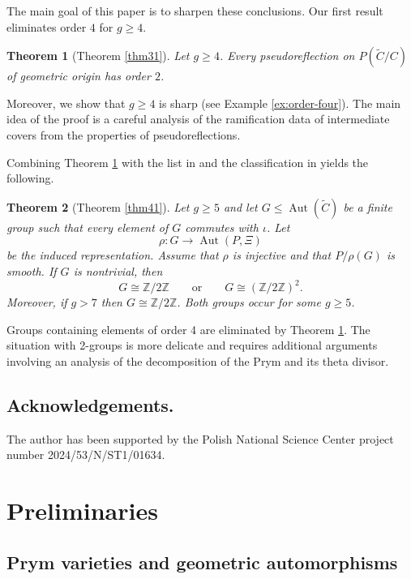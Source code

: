 \documentclass{article}
\newtheorem{thm}{Theorem}[section]
\numberwithin{equation}{section}
\newcommand{\ZZ}{\mathbb Z}
\DeclareMathOperator{\Aut}{Aut}
\begin{document}
The main goal of this paper is to sharpen these conclusions. Our first result eliminates order $4$ for $g \geq 4$.

\begin{thm}[Theorem \ref{thm31}]\label{thm:order-two}
Let $g\geq4$. Every pseudoreflection on $P(\widetilde C/C)$ of geometric origin has order $2$.
\end{thm}

Moreover, we show that $g \geq 4$ is sharp (see Example \ref{ex:order-four}). The main idea of the proof is a careful analysis of the ramification data of intermediate covers from the properties of pseudoreflections.  

Combining Theorem \ref{thm:order-two} with the list in \cite[Proposition 5.1]{ALN} and the classification in \cite[Theorem 3.5]{ALA} yields the following.

\begin{thm}[Theorem \ref{thm41}]\label{thm:main}
Let $g\geq5$ and let $G\leq \Aut(\widetilde C)$ be a finite group such that every element of $G$ commutes with $\iota$. Let
\[
\rho\colon G\longrightarrow \Aut(P,\Xi)
\]
be the induced representation. Assume that $\rho$ is injective and that $P/\rho(G)$ is smooth. If $G$ is nontrivial, then $$ G\cong \ZZ/2\ZZ \qquad\text{or}\qquad G\cong (\ZZ/2\ZZ)^2.$$
Moreover, if $g > 7$ then $G\cong \ZZ/2\ZZ$. 
Both groups occur for some $g \geq 5$.
\end{thm}

Groups containing elements of order 4 are eliminated by Theorem \ref{thm:order-two}. The situation with 2-groups is more delicate and requires additional arguments involving an analysis of the decomposition of the Prym and its theta divisor. 

\subsection*{Acknowledgements.} 
The author has been supported by the Polish National Science Center project number 2024/53/N/ST1/01634.


\section{Preliminaries}\label{sec:prelim}

\subsection{Prym varieties and geometric automorphisms}
\end{document}
